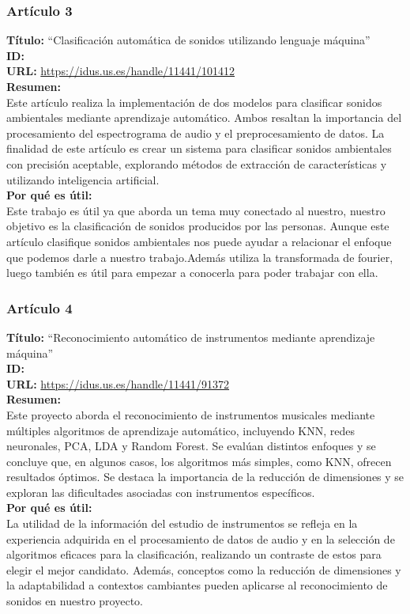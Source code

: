 \subsubsection*{Artículo 3}
    \textbf{Título:}
    “Clasificación automática de sonidos utilizando lenguaje máquina”
    \\
    \textbf{ID: \cite{rodriguez2020clasificacion}}
    \\
    \textbf{URL:}
    \url{https://idus.us.es/handle/11441/101412}
    \\
    \textbf{Resumen:\\}
    Este artículo realiza la implementación de dos modelos para clasificar sonidos ambientales mediante aprendizaje automático. Ambos resaltan la importancia del procesamiento del espectrograma de audio y el preprocesamiento de datos. La finalidad de este artículo es crear un sistema para clasificar sonidos ambientales con precisión aceptable, explorando métodos de extracción de características y utilizando inteligencia artificial.
    \\
    \textbf{Por qué es útil:\\}
    Este trabajo es útil ya que aborda un tema muy conectado al nuestro, nuestro objetivo es la clasificación de sonidos producidos por las personas. Aunque este artículo clasifique sonidos ambientales nos puede ayudar a relacionar el enfoque que podemos darle a nuestro trabajo.Además utiliza la transformada de fourier, luego también es útil para empezar a conocerla para poder trabajar con ella.
\subsubsection*{Artículo 4}
    \textbf{Título:}
    “Reconocimiento automático de instrumentos mediante aprendizaje máquina”
    \\
    \textbf{ID: \cite{salgado2019reconocimiento}}
    \\
    \textbf{URL:}
    \url{https://idus.us.es/handle/11441/91372}
    \\
    \textbf{Resumen:\\}
    Este proyecto aborda el reconocimiento de instrumentos musicales mediante múltiples algoritmos de aprendizaje automático, incluyendo KNN, redes neuronales, PCA, LDA y Random Forest. Se evalúan distintos enfoques y se concluye que, en algunos casos, los algoritmos más simples, como KNN, ofrecen resultados óptimos. Se destaca la importancia de la reducción de dimensiones y se exploran las dificultades asociadas con instrumentos específicos.
    \\
    \textbf{Por qué es útil:\\}
    La utilidad de la información del estudio de instrumentos se refleja en la experiencia adquirida en el procesamiento de datos de audio y en la selección de algoritmos eficaces para la clasificación, realizando un contraste de estos para elegir el mejor candidato. Además, conceptos como la reducción de dimensiones y la adaptabilidad a contextos cambiantes pueden aplicarse al reconocimiento de sonidos en nuestro proyecto.
